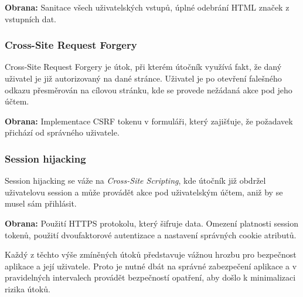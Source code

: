 \textbf{Obrana:} Sanitace všech uživatelských vstupů, úplné odebrání HTML značek z vstupních dat.

\subsubsection*{Cross-Site Request Forgery}
\label{subsubsec:security-attacks-cross-site-request-forgery}
Cross-Site Request Forgery je útok, při kterém útočník využívá fakt, že daný uživatel je již autorizovaný na dané stránce. Uživatel je po otevření falešného odkazu přesměrován na cílovou stránku, kde se provede nežádaná akce pod jeho účtem.

\textbf{Obrana:} Implementace CSRF tokenu v formuláři, který zajišťuje, že požadavek přichází od správného uživatele.

\subsubsection*{Session hijacking}
\label{subsubsec:security-attacks-session-hijacking}
Session hijacking se váže na \textit{Cross-Site Scripting}, kde útočník již obdržel uživatelovu session a může provádět akce pod uživatelským účtem, aniž by se musel sám přihlásit.

\textbf{Obrana:} Použití HTTPS protokolu, který šifruje data. Omezení platnosti session tokenů, použití dvoufaktorové autentizace a nastavení správných cookie atributů.
\newline

Každý z těchto výše zmíněných útoků představuje vážnou hrozbu pro bezpečnost aplikace a její uživatele. Proto je nutné dbát na správné zabezpečení aplikace a v pravidelných intervalech provádět bezpečností opatření, aby došlo k minimalizaci rizika útoků.

\endinput
